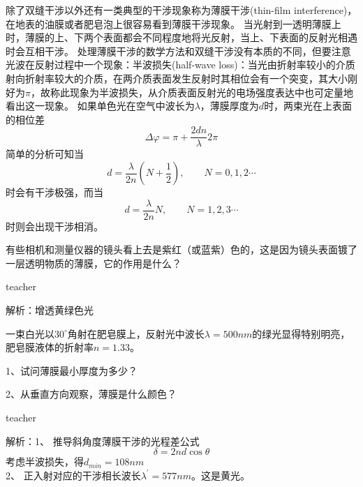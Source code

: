 除了双缝干涉以外还有一类典型的干涉现象称为{\heiti 薄膜干涉}(thin-film interference)，在地表的油膜或者肥皂泡上很容易看到薄膜干涉现象。
当光射到一透明薄膜上时，薄膜的上、下两个表面都会不同程度地将光反射，当上、下表面的反射光相遇时会互相干涉。
处理薄膜干涉的数学方法和双缝干涉没有本质的不同，但要注意光波在反射过程中一个现象：{\heiti 半波损失}(half-wave loss)：当光由折射率较小的介质射向折射率较大的介质，在两介质表面发生反射时其相位会有一个突变，其大小刚好为$\pi$，故称此现象为半波损失，从介质表面反射光的电场强度表达中也可定量地看出这一现象。
如果单色光在空气中波长为$\lambda$，薄膜厚度为$d$时，两束光在上表面的相位差
\[
\Delta \varphi = \pi + \frac{2dn}{\lambda}2\pi
\]
简单的分析可知当
\begin{equation}
d  = \frac{\lambda}{2n}(N+\frac{1}{2}),\qquad N = 0,1,2\cdots
\end{equation}
时会有干涉极强，而当
\begin{equation}
d = \frac{\lambda}{2n}N,\qquad N = 1,2,3\cdots
\end{equation}
时则会出现干涉相消。

\begin{example}
	
	有些相机和测量仪器的镜头看上去是紫红（或蓝紫）色的，这是因为镜头表面镀了一层透明物质的薄膜，它的作用是什么？
	\begin{taggedblock}{teacher}
		
		解析：增透黄绿色光
	\end{taggedblock}
\end{example}






\begin{example}
	一束白光以$30^\circ$角射在肥皂膜上，反射光中波长$\lambda = 500\si{nm}$的绿光显得特别明亮，肥皂膜液体的折射率$ n=1.33$。 
	
	1、试问薄膜最小厚度为多少？
	
	2、从垂直方向观察，薄膜是什么颜色？
	\begin{taggedblock}{teacher}
		
		解析：1、 推导斜角度薄膜干涉的光程差公式
		\[\delta = 2nd \cos \theta\]
		考虑半波损失，得$d_{min}=108nm$\\
		2、 正入射对应的干涉相长波长$\lambda^\prime = 577\si{nm}$。这是黄光。
	\end{taggedblock}
\end{example}%


